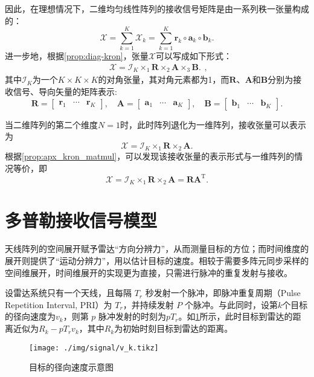 因此，在理想情况下，二维均匀线性阵列的接收信号矩阵是由一系列秩一张量构成的：
\[
    \mathcal{X}
    = \sum_{k=1}^{K} \mathcal{X}_k
    = \sum_{k=1}^{K} \bm{r}_k \circ \bm{a}_k \circ \bm{b}_k.
\]
进一步地，根据\cref{prop:diag-kron}，张量\( \mathcal{X} \)可以写成如下形式：
\[
    \begin{split}
        \mathcal{X} = \mathcal{I}_K \times_1 \mathbf{R} \times_2 \mathbf{A} \times_3 \mathbf{B}.
    \end{split},
\]
其中\( \mathcal{I}_K \)为一个\( K \times K \times K \)的对角张量，其对角元素都为1，而\( \mathbf{R} \)、\( \mathbf{A} \)和\( \mathbf{B} \)分别为接收信号、导向矢量的矩阵表示:
\[
    \mathbf{R} = \begin{bmatrix}
        \bm{r}_1 & \cdots & \bm{r}_K
    \end{bmatrix}, \quad
    \mathbf{A} = \begin{bmatrix}
        \bm{a}_1 & \cdots & \bm{a}_K
    \end{bmatrix}, \quad
    \mathbf{B} = \begin{bmatrix}
        \bm{b}_1 & \cdots & \bm{b}_K
    \end{bmatrix}.
\]

当二维阵列的第二个维度\( N=1 \)时，此时阵列退化为一维阵列，接收张量可以表示为
\[
    \mathcal{X} = \mathcal{I}_K \times_1 \mathbf{R} \times_2 \mathbf{A}.
\]
根据\cref{prop:apx_kron_matmul}，可以发现该接收张量的表示形式与一维阵列的情况等价，即
\[
    \mathcal{X} = \mathcal{I}_K \times_1 \mathbf{R} \times_2 \mathbf{A} = \mathbf{R} \mathbf{A}^{\mathrm{T}}.
\]

\section{多普勒接收信号模型}
天线阵列的空间展开赋予雷达``方向分辨力''，从而测量目标的方位；而时间维度的展开则提供了``运动分辨力''，用以估计目标的速度。相较于需要多阵元同步采样的空间维展开，时间维展开的实现更为直接，只需进行脉冲的重复发射与接收。

设雷达系统只有一个天线，且每隔 \(T_r\) 秒发射一个脉冲，即脉冲重复周期（Pulse Repetition Interval, PRI）为 \(T_r\)，并持续发射 \(P\) 个脉冲。与此同时，设第\( k \)个目标的径向速度为\( v_k \)，则第 \( p \) 脉冲发射的时刻为\( p T_r \)。如\cref{fig_v_k}所示，此时目标到雷达的距离近似为\( R_k -  p T_r v_k\)，其中\( R_k \)为初始时刻目标到雷达的距离。

\begin{figure}[htb!]
    \centering
    \texttt{[image: ./img/signal/v\_k.tikz]}
    \caption{目标的径向速度示意图}
    \label{fig_v_k}
\end{figure}

